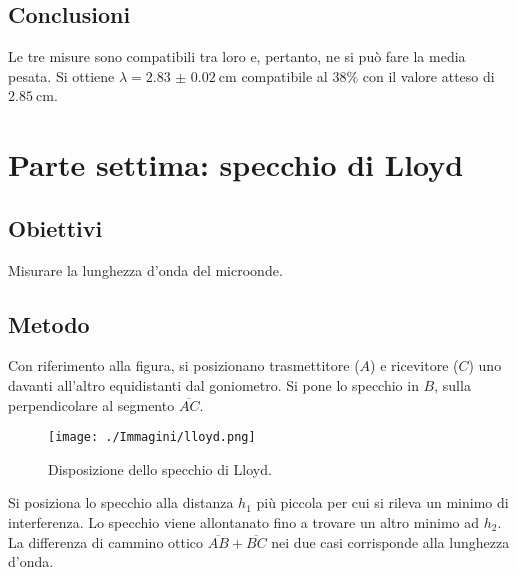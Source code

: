 \documentclass[a4paper]{article}
\begin{document}
\subsection{Conclusioni}
Le tre misure sono compatibili tra loro e, pertanto, ne si può fare la media pesata. Si ottiene $\lambda=\SI{2.83(2)}{\cm}$ compatibile al $38\%$ con il valore atteso di $\SI{2.85}{\cm}$.

\clearpage
\section{Parte settima: specchio di Lloyd}
\subsection{Obiettivi}
Misurare la lunghezza d'onda del microonde.

\subsection{Metodo}
Con riferimento alla figura, si posizionano trasmettitore ($A$) e ricevitore ($C$) uno davanti all'altro equidistanti dal goniometro. Si pone lo specchio in $B$, sulla perpendicolare al segmento $\overline{AC}$.
\begin{figure}[h]
    	\centering
    	\texttt{[image: ./Immagini/lloyd.png]}
	\caption[Specchio di Lloyd]{Disposizione dello specchio di Lloyd.}
\end{figure}
Si posiziona lo specchio alla distanza $h_1$ più piccola per cui si rileva un minimo di interferenza. Lo specchio viene allontanato fino a trovare un altro minimo ad $h_2$. La differenza di cammino ottico $\overline{AB}+\overline{BC}$ nei due casi corrisponde alla lunghezza d'onda.
\end{document}
